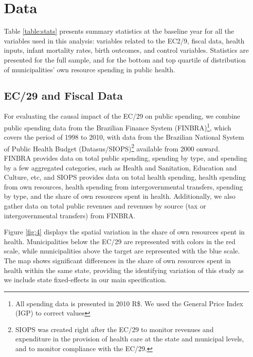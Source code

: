 \section{Data}\label{sec:data}

Table \ref{table:stats} presents summary statistics at the baseline year for all the variables used in this analysis: variables related to the EC2/9, fiscal data, health inputs, infant mortality rates, birth outcomes, and control variables. Statistics are presented for the full sample, and for the bottom and top quartile of distribution of municipalities' own resource spending in public health.






\subsection{EC/29 and Fiscal Data}

For evaluating the causal impact of the EC/29 on public spending, we combine public spending data from the Brazilian Finance System (FINBRA)\footnote{All spending data is presented in 2010 R\$. We used the General Price Index (IGP) to correct values}, which covers the period of 1998 to 2010, with data from the Brazilian National System of Public Health Budget (Datasus/SIOPS)\footnote{SIOPS was created right after the EC/29 to monitor revenues and expenditure in the provision of health care at the state and municipal levels, and to monitor compliance with the EC/29.} available from 2000 onward. FINBRA provides data on total public spending, spending by type, and spending by a few aggregated categories, such as Health and Sanitation, Education and Culture, etc, and SIOPS provides data on total health spending, health spending from own resources, health spending from intergovernmental transfers, spending by type, and the share of own resources spent in health.  Additionally, we also gather data on total public revenues and revenues by source (tax or intergovernmental transfers) from FINBRA.

Figure \ref{fig:4} displays the spatial variation in the share of own resources spent in health. Municipalities below the EC/29 are represented with colors in the red scale, while municipalities above the target are represented with the blue scale. The map shows significant differences in the share of own resources spent in health within the same state, providing the identifying variation of this study as we include state fixed-effects in our main specification. 

